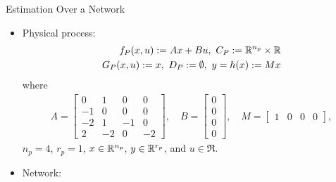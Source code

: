 \begin{example}{Estimation Over a Network}
\begin{itemize}
\item Physical process:
\begin{eqnarray}
\fp(\xp, u):= A\xp + Bu,\ 
   \Cp : = \Re^{n_p}\times\Re\\
\gp(\xp, u):= \xp,\ 
    \Dp: =\emptyset,\ 
\yp = h(\xp) : =M\xp
\end{eqnarray}
where 
\begin{align}
A = 
\begin{bmatrix} 
0&1&0&0\\
-1&0&0&0\\
-2&1&-1&0\\
2&-2&0&-2
\end{bmatrix},\quad
B = \begin{bmatrix} 0\\0\\0\\0 \end{bmatrix},\quad
M = \begin{bmatrix}1&0&0&0\end{bmatrix},
\end{align}
$n_p=4$, $r_p=1$, $x \in{\mathbb R}^{n_p}$, $y\in{\mathbb R}^{r_p}$, and $u\in\Re$.

\item Network: 


\end{itemize}
\end{example}
